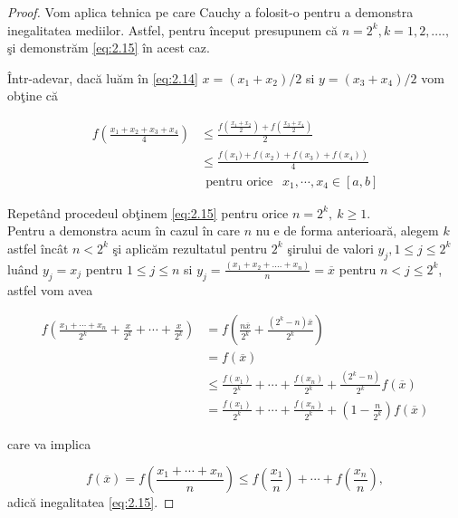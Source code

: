 \documentclass[a4paper,12pt,oneside]{report}
\begin{document}
\begin{proof}
Vom aplica tehnica pe care Cauchy a folosit-o pentru a demonstra inegalitatea mediilor. Astfel, pentru \^{i}nceput presupunem c\u{a} \(n = 2^{k}, k=1,2,….,\) \c{s}i demonstr\u{a}m \ref{eq:2.15} \^{i}n acest caz.

\^{I}ntr-adevar, dac\u{a} lu\u{a}m \^{i}n \ref{eq:2.14} $x=(x_1+x_2)/2$ si $y=(x_3+x_4)/2$ vom ob\c{t}ine c\u{a}

\begin{equation} \nonumber
\begin{split}
   f\left ( \frac{x_1 + x_2+x_3+x_4}{4} \right ) &    \leq \frac{f\left ( \frac{x_1 + x_2}{2} \right) + f\left(\frac{x_3 + x_4}{2} \right )}{2} \\ &   \leq \frac{f\left (x_1) + f\left (x_2 \right )+f\left (x_3 \right )+f\left (x_4 \right ) \right)}{4} \\ &   ~~ \text{pentru orice } ~~ x_1, \cdots, x_4 \in \left [ a, b \right ]
\end{split}
\end{equation}

Repet\^{a}nd procedeul ob\c{t}inem \ref{eq:2.15} pentru orice $n=2^k,~k\geq 1.$\\

 Pentru a demonstra acum \^{i}n cazul \^{i}n care $n$ nu e de forma anterioar\u{a}, alegem  \(k\) astfel \^{i}nc\^{a}t \(n< 2^{k}\) \c{s}i aplic\u{a}m rezultatul pentru \(2^{k}\) \c{s}irului de valori \(y_{j} , 1\leq j\leq 2^{k}\) lu\^{a}nd \(y_{j} = x_{j}\) pentru \(1\leq j\leq n \) si \(y_{j} = \frac{\left ( x_{1} + x_{2} + ....+ x_{n} \right )}{n}=\overline{x}\) pentru \(n< j\leq 2^{k}\), astfel vom avea

 \begin{equation} \nonumber
     \begin{split}
         f\left ( \frac{x_1 + \cdots+x_n}{2^k}+\frac{x}{2^k}+\cdots+\frac{x}{2^k} \right ) &  =f\left( \frac{n \overline{x}}{2^k}+\frac{(2^k-n) \overline{x}}{2^k}\right) \\ &  =f(\overline{x}) \\ & \leq \frac{ f(x_1)}{2^k}+\cdots+\frac{ f(x_n)}{2^k}+\frac{(2^k-n)}{2^k}f(\overline{x}) \\ & =\frac{ f(x_1)}{2^k}+\cdots+\frac{ f(x_n)}{2^k}+ (1-\frac{n}{2^k})f(\overline{x})
     \end{split}
 \end{equation}

care va implica

 \[
 f(\overline{x})=  f\left ( \frac{x_1 + \cdots+x_n}{n} \right )\leq f\left ( \frac{x_1}{n} \right )+\cdots+f\left ( \frac{x_n}{n} \right ),
 \]
 adic\u{a} inegalitatea \ref{eq:2.15}.
\end{proof}
\end{document}
